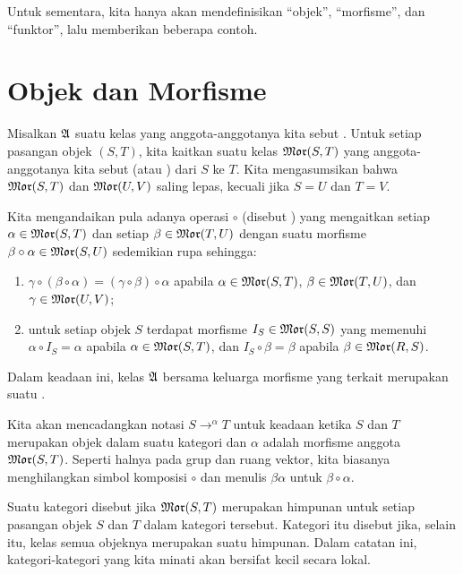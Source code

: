 Untuk sementara, kita hanya akan mendefinisikan ``objek'', ``morfisme'', dan ``funktor'', lalu memberikan beberapa contoh.









\section{Objek dan Morfisme}\label{C0151}
\begin{defn} Misalkan $\mathfrak{A}$ suatu kelas yang anggota-anggotanya kita sebut
. Untuk setiap pasangan objek $(S,T)$, kita kaitkan suatu kelas $\operatorname{\mathfrak{Mor}}(S,T)$ yang
anggota-anggotanya kita sebut
 (atau
) dari $S$ ke $T$. Kita mengasumsikan bahwa $\operatorname{\mathfrak{Mor}}(S,T)$ dan $\operatorname{\mathfrak{Mor}}(U,V)$ saling lepas,
kecuali jika $S = U$ dan $T = V$.

Kita mengandaikan pula adanya operasi $\circ$ (disebut ) yang
mengaitkan setiap $\alpha \in \operatorname{\mathfrak{Mor}}(S,T)$ dan setiap $\beta \in \operatorname{\mathfrak{Mor}}(T,U)$ dengan suatu morfisme
$\beta \circ \alpha \in \operatorname{\mathfrak{Mor}}(S,U)$ sedemikian rupa sehingga:
 \begin{enumerate}
  \item $\gamma \circ (\beta \circ \alpha) = (\gamma \circ
\beta) \circ \alpha$ apabila $\alpha \in \operatorname{\mathfrak{Mor}}(S,T)$, $\beta \in \operatorname{\mathfrak{Mor}}(T,U)$, dan $\gamma \in
\operatorname{\mathfrak{Mor}}(U,V)$;
  \item untuk setiap objek $S$ terdapat morfisme $I_S \in
\operatorname{\mathfrak{Mor}}(S,S)$ yang memenuhi $\alpha \circ I_S = \alpha$ apabila $\alpha \in \operatorname{\mathfrak{Mor}}(S,T)$, dan $I_S
\circ \beta = \beta$ apabila $\beta \in \operatorname{\mathfrak{Mor}}(R,S)$.
 \end{enumerate}
Dalam keadaan ini, kelas $\mathfrak{A}$ bersama keluarga morfisme yang terkait merupakan suatu
.

Kita akan mencadangkan notasi
$S \to^\alpha T$ untuk keadaan ketika $S$ dan $T$ merupakan objek dalam suatu kategori dan
$\alpha$ adalah morfisme anggota $\operatorname{\mathfrak{Mor}}(S,T)$. Seperti halnya pada grup dan ruang vektor,
kita biasanya menghilangkan simbol komposisi $\circ$ dan menulis
$\beta\alpha$ untuk $\beta \circ \alpha$.

Suatu kategori disebut
 jika $\operatorname{\mathfrak{Mor}}(S,T)$ merupakan himpunan untuk setiap pasangan objek $S$ dan $T$ dalam kategori tersebut. Kategori itu disebut
 jika, selain itu, kelas semua objeknya merupakan suatu himpunan. Dalam catatan ini, kategori-kategori yang kita minati
akan bersifat kecil secara lokal.
\end{defn}


